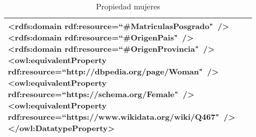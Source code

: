 \begin{table}[!ht]
\begin{tabular}{|p{}|p{}|}
		\tab\textless rdfs:domain\newline
		\tab\tab rdf:resource=``\#MatriculasPosgrado"\ /\textgreater\newline
		\tab\textless rdfs:domain\newline
		\tab\tab rdf:resource=``\#OrigenPais"\ /\textgreater\newline
		\tab\textless rdfs:domain\newline
		\tab\tab rdf:resource=``\#OrigenProvincia"\ /\textgreater\newline
		\tab\textless owl:equivalentProperty\newline
		\tab\tab rdf:resource=``http://dbpedia.org/page/Woman"\  /\textgreater\newline
		\tab\textless owl:equivalentProperty\newline
		\tab\tab rdf:resource=``https://schema.org/Female"\  /\textgreater\newline
		\tab\textless owl:equivalentProperty\newline
		\tab\tab rdf:resource=``https://www.wikidata.org/wiki/Q467"\  /\textgreater\newline
		\textless /owl:DatatypeProperty\textgreater
		\\ \hline
	\end{tabular}
	\caption{Propiedad mujeres}
	\label{propiedad-mujeres}
\end{table}

